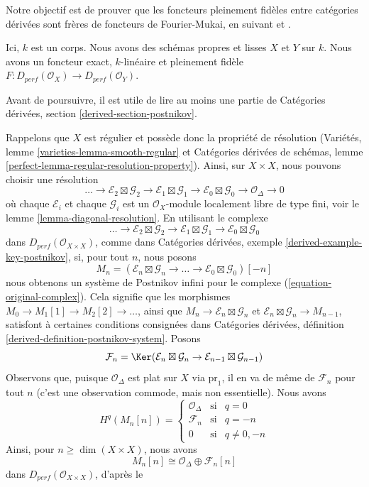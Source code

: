 \noindent
Notre objectif est de prouver que les foncteurs pleinement fidèles entre catégories dérivées
sont frères de foncteurs de Fourier-Mukai, en suivant
\cite{Orlov-K3} et \cite{Ballard}.

\begin{situation}
\label{situation-fully-faithful}
Ici, $k$ est un corps. Nous avons des schémas propres et lisses $X$ et $Y$ sur $k$.
Nous avons un foncteur exact, $k$-linéaire et pleinement fidèle
$F : D_{perf}(\mathcal{O}_X) \to D_{perf}(\mathcal{O}_Y)$.
\end{situation}

\noindent
Avant de poursuivre, il est utile de lire au moins une partie de
Catégories dérivées, section \ref{derived-section-postnikov}.

\medskip\noindent
Rappelons que $X$ est régulier et possède donc la propriété de résolution
(Variétés, lemme \ref{varieties-lemma-smooth-regular} et
Catégories dérivées de schémas, lemme
\ref{perfect-lemma-regular-resolution-property}). Ainsi,
sur $X \times X$, nous pouvons choisir une résolution
$$
\ldots \to
\mathcal{E}_2 \boxtimes \mathcal{G}_2 \to
\mathcal{E}_1 \boxtimes \mathcal{G}_1 \to
\mathcal{E}_0 \boxtimes \mathcal{G}_0 \to
\mathcal{O}_\Delta \to 0
$$
où chaque $\mathcal{E}_i$ et chaque $\mathcal{G}_i$ est un
$\mathcal{O}_X$-module localement libre de type fini, voir le
lemme \ref{lemma-diagonal-resolution}.
En utilisant le complexe
\begin{equation}
\label{equation-original-complex}
\ldots \to
\mathcal{E}_2 \boxtimes \mathcal{G}_2 \to
\mathcal{E}_1 \boxtimes \mathcal{G}_1 \to
\mathcal{E}_0 \boxtimes \mathcal{G}_0
\end{equation}
dans $D_{perf}(\mathcal{O}_{X \times X})$, comme dans
Catégories dérivées, exemple \ref{derived-example-key-postnikov},
si, pour tout $n$, nous posons
$$
M_n = (\mathcal{E}_n \boxtimes \mathcal{G}_n \to \ldots \to
\mathcal{E}_0 \boxtimes \mathcal{G}_0)[-n]
$$
nous obtenons un système de Postnikov infini pour le complexe
(\ref{equation-original-complex}). Cela signifie que
les morphismes $M_0 \to M_1[1] \to M_2[2] \to \ldots$, ainsi que
$M_n \to \mathcal{E}_n \boxtimes \mathcal{G}_n$ et
$\mathcal{E}_n \boxtimes \mathcal{G}_n \to M_{n - 1}$,
satisfont à certaines conditions consignées dans
Catégories dérivées, définition \ref{derived-definition-postnikov-system}.
Posons
$$
\mathcal{F}_n = \Ker(\mathcal{E}_n \boxtimes \mathcal{G}_n \to
\mathcal{E}_{n - 1} \boxtimes \mathcal{G}_{n - 1})
$$
Observons que, puisque $\mathcal{O}_\Delta$ est plat sur $X$ via $\text{pr}_1$,
il en va de même de $\mathcal{F}_n$ pour tout $n$ (c'est une observation
commode, mais non essentielle). Nous avons
$$
H^q(M_n[n]) = \left\{
\begin{matrix}
\mathcal{O}_\Delta & \text{si} & q = 0 \\
\mathcal{F}_n & \text{si} & q = -n \\
0 & \text{si} & q \not = 0, -n
\end{matrix}
\right.
$$
Ainsi, pour $n \geq \dim(X \times X)$, nous avons
$$
M_n[n] \cong \mathcal{O}_\Delta \oplus \mathcal{F}_n[n]
$$
dans $D_{perf}(\mathcal{O}_{X \times X})$, d'après le

